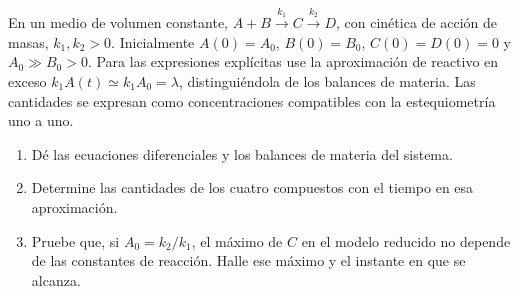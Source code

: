 En un medio de volumen constante, $A+B\xrightarrow{k_1}C\xrightarrow{k_2}D$, con cinética de acción de masas, $k_1,k_2>0$. Inicialmente $A(0)=A_0$, $B(0)=B_0$, $C(0)=D(0)=0$ y $A_0\gg B_0>0$. Para las expresiones explícitas use la aproximación de reactivo en exceso $k_1A(t)\simeq k_1A_0=\lambda$, distinguiéndola de los balances de materia. Las cantidades se expresan como concentraciones compatibles con la estequiometría uno a uno.

\begin{enumerate}[label=(\alph*),ref=\alph*,leftmargin=*]
\item Dé las ecuaciones diferenciales y los balances de materia del sistema.
\item Determine las cantidades de los cuatro compuestos con el tiempo en esa aproximación.
\item Pruebe que, si $A_0=k_2/k_1$, el máximo de $C$ en el modelo reducido no depende de las constantes de reacción. Halle ese máximo y el instante en que se alcanza.
\end{enumerate}
